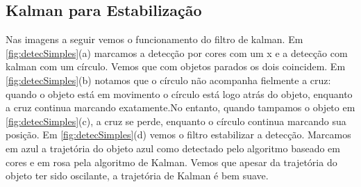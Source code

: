 \documentclass[journal]{IEEEtran}
\begin{document}
\subsection{Kalman para Estabilização}

Nas imagens a seguir vemos o funcionamento do filtro de kalman.
Em \ref{fig:detecSimples}(a) marcamos a detecção por cores com um x e
a detecção com kalman com um círculo. Vemos que com objetos parados 
os dois coincidem. Em \ref{fig:detecSimples}(b) notamos que o 
círculo não acompanha fielmente a cruz: quando o objeto está em 
movimento o círculo está logo atrás do objeto, enquanto a cruz 
continua marcando exatamente.No entanto, quando tampamos o objeto em 
\ref{fig:detecSimples}(c), a cruz se perde, 
enquanto o círculo continua marcando sua posição. Em 
\ref{fig:detecSimples}(d) vemos o filtro estabilizar a detecção. 
Marcamos em azul a trajetória do objeto azul como detectado pelo
algoritmo baseado em cores e em rosa pela algoritmo de Kalman.
Vemos que apesar da trajetória do objeto ter sido oscilante,
a trajetória de Kalman é bem suave.
\end{document}
